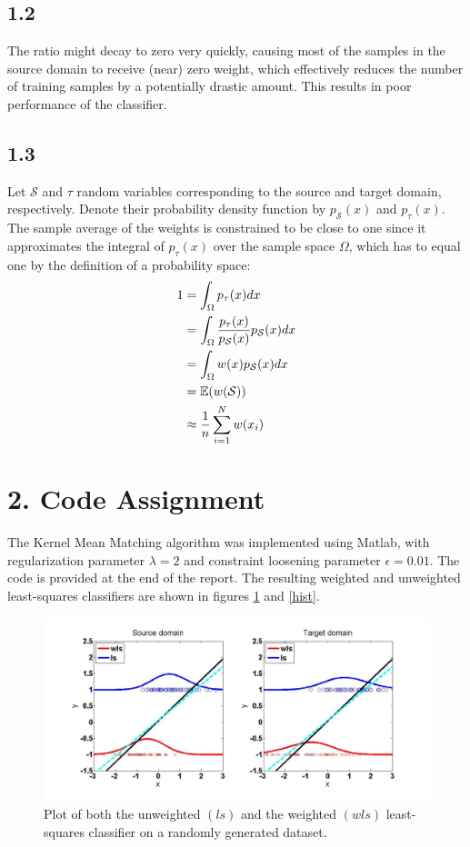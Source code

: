 \documentclass [a4paper] {report}
\begin{document}
	\subsection*{1.2}
	The ratio might decay to zero very quickly, causing most of the samples in the source domain to receive (near) zero weight, which effectively reduces the number of training samples by a potentially drastic amount. This results in poor performance of the classifier.
	
	\subsection*{1.3}
	Let $\mathcal{S}$ and $\tau$ random variables corresponding to the source and target domain, respectively. Denote their probability density function by $p_{\mathcal{S}}(x)$ and $p_{\tau}(x)$. \\
	
	The sample average of the weights is constrained to be close to one since it approximates the integral of $p_{\tau}(x)$ over the sample space $\Omega$, which has to equal one by the definition of a probability space:
	\begin{align*}
		1 &= \int_{\Omega} p_{\tau}(x)dx\\
		&= \int_{\Omega} {p_{\tau}(x) \over p_{\mathcal{S}}(x)}p_{\mathcal{S}}(x)dx\\
		&= \int_{\Omega} w(x)p_{\mathcal{S}}(x)dx\\
		&= \mathbb{E}(w(\mathcal{S}))\\
		&\approx {1\over n} \sum_{i=1}^{N}  w(x_{i})
	\end{align*}
	
	\newpage
	\section*{2. Code Assignment}
	The Kernel Mean Matching algorithm was implemented using Matlab, with regularization parameter $\lambda=2$ and constraint loosening parameter $\epsilon=0.01$. The code is provided at the end of the report. The resulting weighted and unweighted least-squares classifiers are shown in figures \ref{plot} and \ref{hist}. 
	
	\begin{figure}[H]
		\begin{center}
			\includegraphics[scale=0.35]{Images/Plot_lambda2eps0_01.jpg}
			\caption{Plot of both the unweighted $(ls)$ and the weighted $(wls)$ least-squares classifier on a randomly generated dataset.}
			\label{plot}
		\end{center}
	\end{figure}
	
\end{document}
